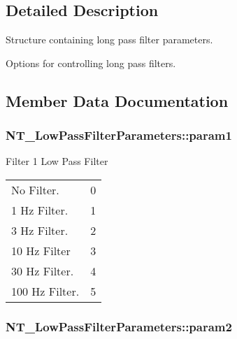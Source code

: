 \subsection{Detailed Description}
Structure containing long pass filter parameters. 

Options for controlling long pass filters. 

\subsection{Member Data Documentation}
\subsubsection[{\texorpdfstring{param1}{param1}}]{ N\+T\+\_\+\+Low\+Pass\+Filter\+Parameters\+::param1}\hypertarget{struct_n_t___low_pass_filter_parameters_ae1f60f73597aaf643f76b1cb981410d4}{}\label{struct_n_t___low_pass_filter_parameters_ae1f60f73597aaf643f76b1cb981410d4}


Filter 1 Low Pass Filter \tabulinesep=1mm
\begin{longtabu} spread 0pt [c]{*2{|X[-1]}|}
\hline
No Filter.&0 \\
1 Hz Filter.&1 \\
3 Hz Filter.&2 \\
10 Hz Filter&3 \\
30 Hz Filter.&4 \\
100 Hz Filter.&5 \\
\end{longtabu}


\subsubsection[{\texorpdfstring{param2}{param2}}]{ N\+T\+\_\+\+Low\+Pass\+Filter\+Parameters\+::param2}\hypertarget{struct_n_t___low_pass_filter_parameters_a7fa8773351313647da35b160e36c2769}{}\label{struct_n_t___low_pass_filter_parameters_a7fa8773351313647da35b160e36c2769}


